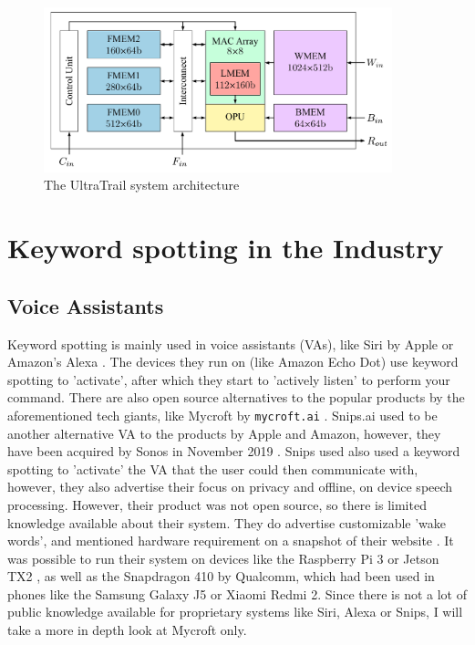 \begin{figure}[htb]
    \centering
    \includegraphics[width=0.9\textwidth]{figures/ultratrail.png}
    \caption[Illustration: The UltraTrail system architecture (Fig. 5)\cite{ultratrail}]{The UltraTrail system architecture}
    \label{fig:ultratrail_arch}
\end{figure}

\section{Keyword spotting in the Industry}

\subsection{Voice Assistants}

Keyword spotting is mainly used in voice assistants (VAs), like Siri by Apple \cite{siri} or Amazon's Alexa \cite{alexa}.
The devices they run on (like Amazon Echo Dot) use keyword spotting to 'activate', after which they start
to 'actively listen' to perform your command.
There are also open source alternatives to the popular products by the aforementioned tech giants, like Mycroft by \lstinline{mycroft.ai} \cite{mycroft}.
Snips.ai used to be another alternative VA to the products by Apple and Amazon, however, they have been acquired by Sonos in November 2019 \cite{sonos_snips}.
Snips used also used a keyword spotting to 'activate' the VA that the user could then communicate with, however, they also advertise their focus
on privacy and offline, on device speech processing.
However, their product was not open source, so there is limited knowledge available about their system.
They do advertise customizable 'wake words', and mentioned hardware requirement on a snapshot of their website \cite{snips_flow}.
It was possible to run their system on devices like the Raspberry Pi 3 \cite{rpi3} or Jetson TX2 \cite{jetson_tx2},
as well as the Snapdragon 410 \cite{snapdragon_410} by Qualcomm, which had been used in phones like the Samsung Galaxy J5 or Xiaomi Redmi 2.
Since there is not a lot of public knowledge available for proprietary systems like Siri, Alexa or Snips, I will take a more in depth look at Mycroft only.

